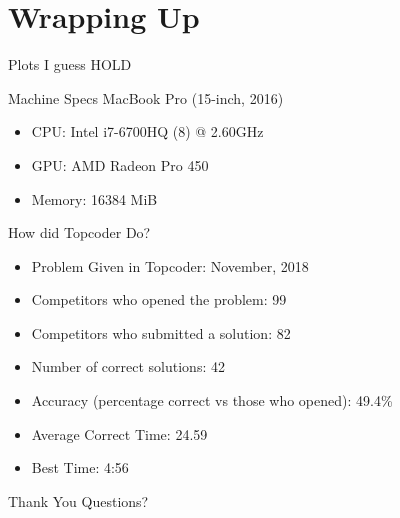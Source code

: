 \documentclass[10pt]{beamer}
\begin{document}
\section{Wrapping Up}

\begin{frame}{Plots I guess}
  HOLD
\end{frame}

\begin{frame}{Machine Specs}
  \Large
  MacBook Pro (15-inch, 2016)
  \begin{itemize} %
    \item CPU\@: Intel i7\@-6700HQ (8) @ 2.60GHz
    \item GPU\@: AMD Radeon Pro 450
    \item Memory: 16384 MiB
  \end{itemize}

\end{frame}

\begin{frame}{How did Topcoder Do?}
  \large
  \begin{itemize}
    \item Problem Given in Topcoder: November, 2018
    \item Competitors who opened the problem: 99
    \item Competitors who submitted a solution: 82
    \item Number of correct solutions: 42
    \item Accuracy (percentage correct vs those who opened): 49.4\%
    \item Average Correct Time: 24.59
    \item Best Time: 4:56
  \end{itemize}
\end{frame}

\begin{frame}{Thank You}
  \Huge Questions?
\end{frame}
\end{document}
